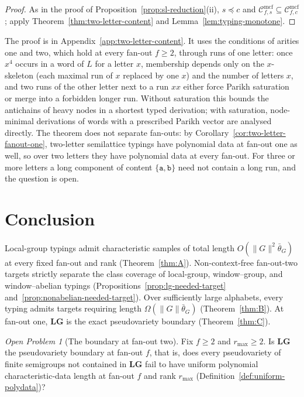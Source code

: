 \documentclass[11pt]{article}
\numberwithin{equation}{section}
\theoremstyle{plain}
\theoremstyle{definition}
\theoremstyle{remark}
\newtheorem{openproblem}[theorem]{Open Problem}
\newcommand{\Cmcf}[2]{\mathcal{C}^{\mathrm{mcf}}_{#1,#2}}
\theoremstyle{plain}
\begin{document}
\begin{proof}
As in the proof of Proposition~\ref{prop:sl-reduction}(ii), $s\preceq c$ and
$\Cmcf{f}{s}\subseteq\Cmcf{f}{c}$; apply Theorem~\ref{thm:two-letter-content} and
Lemma~\ref{lem:typing-monotone}.
\end{proof}

The proof is in Appendix~\ref{app:two-letter-content}.  It uses the
conditions of arities one and two, which hold at every fan-out $f\ge2$, through
runs of one letter: once $x^4$ occurs in a word of
$L$ for a letter $x$, membership depends only on the $x$-skeleton (each maximal
run of $x$ replaced by one $x$) and the number of letters $x$, and two runs of the other letter next to a run $xx$ either
force Parikh saturation or merge into a forbidden longer run.  Without
saturation this bounds the antichains of heavy nodes in a shortest typed
derivation; with saturation, node-minimal derivations of words with a
prescribed Parikh vector are analysed directly.  The theorem does not separate
fan-outs: by Corollary~\ref{cor:two-letter-fanout-one}, two-letter
semilattice typings have polynomial data at fan-out one as well, so over two
letters they have polynomial data at every fan-out.  For three or more
letters a long component of content $\{\mathtt a,\mathtt b\}$ need not contain a
long run, and the question is open.

\section{Conclusion}
\label{sec:conclusion}

Local-group typings admit characteristic samples of total length
$O(\|G\|^2\bar\theta_G)$ at every fixed fan-out and rank
(Theorem~\ref{thm:A}). Non-context-free fan-out-two targets
strictly separate the class coverage of local-group,
window--group, and window--abelian typings
(Propositions~\ref{prop:lg-needed-target}
and~\ref{prop:nonabelian-needed-target}).
Over sufficiently large alphabets, every typing admits
targets requiring length $\Omega(\|G\|\bar\theta_G)$
(Theorem~\ref{thm:B}). At fan-out one, $\mathbf{LG}$ is
the exact pseudovariety boundary (Theorem~\ref{thm:C}).

\begin{openproblem}[The boundary at fan-out two]
\label{op:fanout-two}
Fix $f\ge2$ and $r_{\max}\ge2$.  Is $\mathbf{LG}$ the pseudovariety boundary at
fan-out $f$, that is, does every pseudovariety of finite semigroups not
contained in $\mathbf{LG}$ fail to have uniform polynomial characteristic-data
length at fan-out $f$ and rank $r_{\max}$
(Definition~\ref{def:uniform-polydata})?
\end{openproblem}
\end{document}
